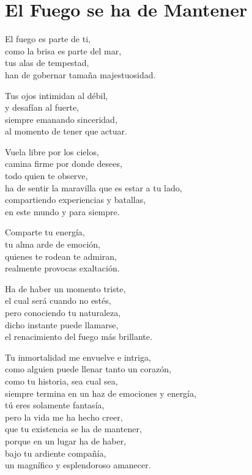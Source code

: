 \section*{El Fuego se ha de Mantener}
\label{El_fuego_se_ha}

\vspace{1em}
\begin{center}
El fuego es parte de ti,\\ 
como la brisa es parte del mar,\\ 
tus alas de tempestad,\\ 
han de gobernar tamaña majestuosidad.

\vspace{1em} 
Tus ojos intimidan al débil,\\ 
y desafían al fuerte,\\ 
siempre emanando sinceridad,\\ 
al momento de tener que actuar.

\vspace{1em} 
Vuela libre por los cielos, \\ 
camina firme por donde desees,\\ 
todo quien te observe,\\ 
ha de sentir la maravilla que es estar a tu lado,\\ 
compartiendo experiencias y batallas,\\ 
en este mundo y para siempre.

\vspace{1em} 
Comparte tu energía,\\ 
tu alma arde de emoción,\\ 
quienes te rodean te admiran,\\ 
realmente provocas exaltación.

\vspace{1em} 
Ha de haber un momento triste,\\ 
el cual será cuando no estés,\\ 
pero conociendo tu naturaleza,\\ 
dicho instante puede llamarse,\\ 
el renacimiento del fuego más brillante.

\vspace{1em} 
Tu inmortalidad me envuelve e intriga,\\ 
como alguien puede llenar tanto un corazón,\\ 
como tu historia, sea cual sea,\\ 
siempre termina en un haz de emociones y energía,\\ 
tú eres solamente fantasía,\\ 
pero la vida me ha hecho creer,\\ 
que tu existencia se ha de mantener,\\ 
porque en un lugar ha de haber,\\ 
bajo tu ardiente compañía,\\ 
un magnífico y esplendoroso amanecer.


\end{center}




